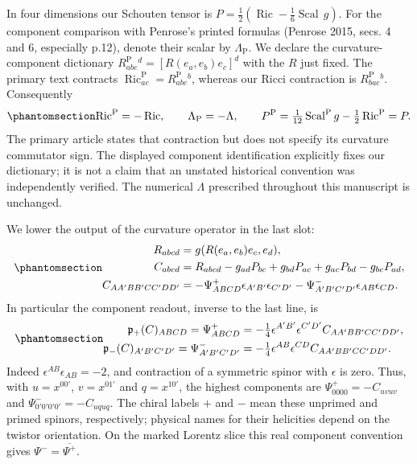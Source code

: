 \documentclass[
  english,
  11pt,
  reqno]{amsart}
\begin{document}
In four dimensions our Schouten tensor is
\(P=\tfrac12(\operatorname{Ric}-\tfrac16\operatorname{Scal}\,g)\). For
the component comparison with Penrose's printed formulas (Penrose 2015,
secs. 4 and 6, especially p.12), denote their scalar by
\(\Lambda_{\mathrm P}\). We declare the curvature-component dictionary
\(R^{\mathrm P}_{abc}{}^d=[R(e_a,e_b)e_c]^d\) with the \(R\) just fixed.
The primary text contracts
\(\operatorname{Ric}^{\mathrm P}_{ac}=R^{\mathrm P}_{abc}{}^b\), whereas
our Ricci contraction is \(R^{\mathrm P}_{bac}{}^b\). Consequently
\begin{equation}\protect\phantomsection\label{eq:gg-original-infinity-curvature-dictionary}{
 \operatorname{Ric}^{\mathrm P}=-\operatorname{Ric},\qquad
 \Lambda_{\mathrm P}=-\Lambda,\qquad
 P^{\mathrm P}
   =\tfrac1{12}\operatorname{Scal}^{\mathrm P}g
                         -\tfrac12\operatorname{Ric}^{\mathrm P}
   =P .
}\end{equation} The primary article states that contraction but does not
specify its curvature commutator sign. The displayed component
identification explicitly fixes our dictionary; it is not a claim that
an unstated historical convention was independently verified. The
numerical \(\Lambda\) prescribed throughout this manuscript is
unchanged.

We lower the output of the curvature operator in the last slot:
\begin{equation}\protect\phantomsection\label{eq:gg-weyl-spinor-decomposition}{
 \begin{aligned}
 R_{abcd}&=g(R(e_a,e_b)e_c,e_d),\\
 C_{abcd}&=R_{abcd}
   -g_{ad}P_{bc}+g_{bd}P_{ac}+g_{ac}P_{bd}-g_{bc}P_{ad},\\
 C_{AA'BB'CC'DD'}
 &=-\Psi^+_{ABCD}\epsilon_{A'B'}\epsilon_{C'D'}
   -\Psi^-_{A'B'C'D'}\epsilon_{AB}\epsilon_{CD} .
 \end{aligned}
}\end{equation} In particular the component readout, inverse to the last
line, is
\begin{equation}\protect\phantomsection\label{eq:gg-weyl-spinor-readout}{
 \begin{aligned}
 \mathfrak p_+(C)_{ABCD}=\Psi^+_{ABCD}
   &=-\tfrac14\epsilon^{A'B'}\epsilon^{C'D'}
                       C_{AA'BB'CC'DD'},\\
 \mathfrak p_-(C)_{A'B'C'D'}=\Psi^-_{A'B'C'D'}
   &=-\tfrac14\epsilon^{AB}\epsilon^{CD}
                       C_{AA'BB'CC'DD'} .
 \end{aligned}
}\end{equation} Indeed \(\epsilon^{AB}\epsilon_{AB}=-2\), and
contraction of a symmetric spinor with \(\epsilon\) is zero. Thus, with
\(u=x^{00'}\), \(v=x^{01'}\) and \(q=x^{10'}\), the highest components
are \(\Psi^+_{0000}=-C_{uvuv}\) and \(\Psi^-_{0'0'0'0'}=-C_{uquq}\). The
chiral labels \(+\) and \(-\) mean these unprimed and primed spinors,
respectively; physical names for their helicities depend on the twistor
orientation. On the marked Lorentz slice this real component convention
gives \(\Psi^-=\overline{\Psi^+}\).
\end{document}

